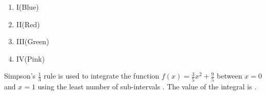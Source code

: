 \begin{enumerate}
    \item I(Blue)
    \item II(Red)
    \item III(Green)
    \item IV(Pink)
\end{enumerate}

\item Simpson's $\frac{1}{3}$ rule is used to integrate the function $f(x)=\frac{3}{5}x^2+\frac{9}{5}$ between $x=0$ and $x=1$ using the least number of sub-intervals . The value of the integral is .
 \hfill{}





